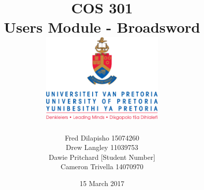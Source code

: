\documentclass{article}
\title{COS 301 \\ Users Module - Broadsword \\[0.5cm] \includegraphics[width=6cm]{front-page}}
\author{ Fred Dilapisho \hfill 15074260 \\ Drew Langley \hfill 11039753 \\ Dawie Pritchard \hfill [Student Number]\\ Cameron Trivella \hfill 14070970}
\date{15 March 2017}
\begin{document}
\maketitle
\pagebreak
\tableofcontents
\pagebreak
\end{document}
